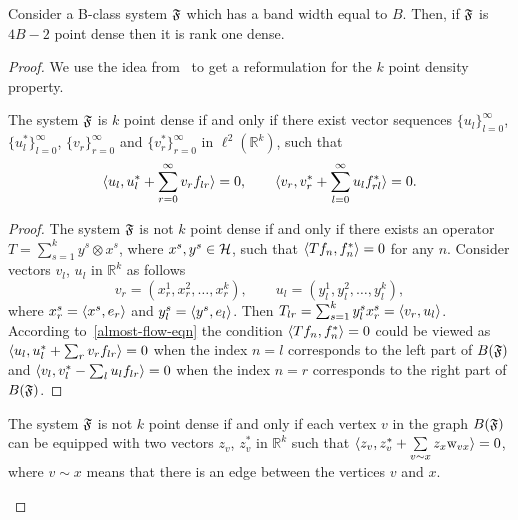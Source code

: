 \documentclass[12pt,oneside,a4paper]{amsart}
\begin{document}
      \begin{theorem}
        Consider a B-class system $\fsys$ which has a band width equal to $B$.
        Then, if $\fsys$ is $4B - 2$ point dense then it is rank one dense.
      \end{theorem}
      \begin{proof}
        We use the idea from~\cite{me} to get a reformulation for the $k$ point density property.
        \begin{prop}
          \label{prop-vec-est}
          The system $\fsys$ is $k$ point dense if and only if there exist vector sequences $\{u_l\}_{l=0}^\infty$, $\{u^*_l\}_{l=0}^\infty$,
            $\{v_r\}_{r=0}^\infty$ and $\{v^*_r\}_{r=0}^\infty$ in $\ell^2 (\mathbb{R}^k)$, such that
          \begin{equation}
            \label{prop-vec-eqn}
            \inner{u_l}{u^*_l + \sum_{r=0}^\infty v_r f_{lr}} = 0, \quad \quad
            \inner{v_r}{v^*_r + \sum_{l=0}^\infty u_l f_{rl}^*} = 0.
          \end{equation}
        \end{prop}
        \begin{proof}
          The system $\fsys$ is not $k$ point dense if and only if there exists an operator $T = \sum_{s=1}^k y^s \otimes x^s$, where
            $x^s, y^s \in \cal{H}$, such that $\inner{Tf_n}{f_n^*} = 0$ for any $n$.
          Consider vectors $v_l$, $u_l$ in $\mathbb{R}^k$ as follows
          \begin{equation*}
            v_r = (x^1_r, x^2_r, \dots, x^k_r),\qquad
            u_l = (y^1_l, y^2_l, \dots, y^k_l),
          \end{equation*}
            where $x^s_r = \inner{x^s}{e_r}$ and $y^s_l = \inner{y^s}{e_l}$.
          Then $T_{lr} = \sum_{s=1}^k y^s_l x^s_r = \inner{v_r}{u_l}$.
          According to~\eqref{almost-flow-eqn} the condition $\inner{Tf_n}{f^*_n} = 0$ could be viewed as
            $\inner{u_l}{u^*_l + \sum_r v_r f_{lr}} = 0$
          when the index $n=l$ corresponds to the left part of $B(\fsys)$ and
            $\inner{v_l}{v^*_l - \sum_l u_l f_{lr}} = 0$
          when the index $n=r$ corresponds to the right part of $B(\fsys)$.
        \end{proof}
        \begin{corol*}
          The system $\fsys$ is not $k$ point dense if and only if each vertex $v$ in the graph $B(\fsys)$ can be
            equipped with two vectors $z_v$, $z_v^*$ in $\mathbb{R}^k$ such that $\inner{z_v}{z_v^* + \sum\limits_{v \sim x} z_x \wt_{vx}} = 0$,
            where $v \sim x$ means that there is an edge between the vertices $v$ and $x$.
        \end{corol*}


\end{proof}
\end{document}
